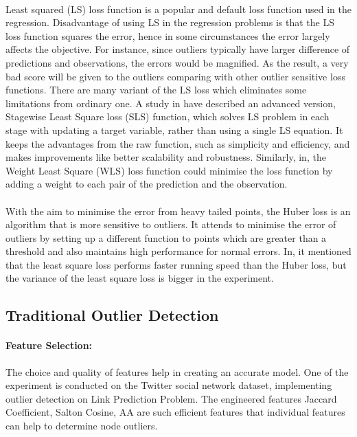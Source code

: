 \documentclass[runningheads]{llncs}
\begin{document}
\paragraph{} Least squared (LS) loss function is a popular and default loss function used in the regression. Disadvantage of using LS in the regression problems is that the LS loss function squares the error, hence in some circumstances the error largely affects the objective. For instance, since outliers typically have larger difference of predictions and observations, the errors would be magnified. As the result, a very bad score will be given to the outliers comparing with other outlier sensitive loss functions. There are many variant of the LS loss which eliminates some limitations from ordinary one. A study in have described an advanced version, Stagewise Least Square loss (SLS) function, which solves LS problem in each stage with updating a target variable, rather than using a single LS equation. It keeps the advantages from the raw function, such as simplicity and efficiency, and makes improvements like better scalability and robustness. Similarly, in, the Weight Least Square (WLS) loss function could minimise the loss function by adding a weight to each pair of the prediction and the observation.

\paragraph{}With the aim to minimise the error from heavy tailed points, the Huber loss is an algorithm that is more sensitive to outliers. It attends to minimise the error of outliers by setting up a different function to points which are greater than a threshold and also maintains high performance for normal errors. In, it mentioned that the least square loss performs faster running speed than the Huber loss, but the variance of the least square loss is bigger in the experiment.

\subsection{Traditional Outlier Detection}


\paragraph*{Feature Selection:} The choice and quality of features help in creating an accurate model. One of the experiment is conducted on the Twitter social network dataset, implementing outlier detection on Link Prediction Problem. The engineered features Jaccard Coefficient, Salton Cosine, AA are such efficient features that individual features can help to determine node outliers.
\end{document}
